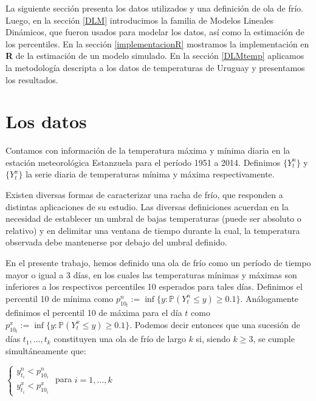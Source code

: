 \documentclass[12pt]{article}\usepackage[]{graphicx}\usepackage[]{color}
\newcommand{\p}{\mathbb{P}}
\begin{document}
La siguiente sección presenta los datos utilizados y una definición de ola de frío. Luego, en la sección \ref{DLM} introducimos la familia de Modelos Lineales Dinámicos, que fueron usados para modelar los datos, así como la estimación de los percentiles. En la sección \ref{implementacionR} mostramos la implementación en \textbf{R} de la estimación de un modelo simulado. En la sección \ref{DLMtemp} aplicamos la metodología descripta a los datos de temperaturas de Uruguay y presentamos los resultados.

\section{Los datos}

Contamos con información de la temperatura máxima y mínima diaria en la estación meteorológica Estanzuela para el período 1951 a 2014. Definimos $\{Y^n_{t}\}$ y $\{Y^x_{t}\}$ la serie diaria de temperaturas mínima y máxima respectivamente.

Existen diversas formas de caracterizar una racha de frío, que responden a distintas aplicaciones de su estudio. Las diversas definiciones acuerdan en la necesidad de establecer un umbral de bajas temperaturas (puede ser absoluto o relativo) y en delimitar una ventana de tiempo durante la cual, la temperatura observada debe mantenerse por debajo del umbral definido. 

En el presente trabajo, hemos definido una ola de frío como un período de tiempo mayor o igual a 3 días, en los cuales las temperaturas mínimas y máximas son inferiores a los respectivos percentiles 10 esperados para tales días. Definimos el percentil 10 de mínima como $p^n_{10_t}:= \inf\{y: \p(Y^n_t \leq y)\geq 0.1\}$. Análogamente definimos el percentil 10 de máxima para el día $t$ como $p^x_{10_t}:= \inf\{y: \p(Y^x_t \leq y)\geq 0.1\}$. Podemos decir entonces que una sucesión de días $t_1, \dots, t_k$ constituyen una ola de frío de largo $k$ si, siendo $k\geq 3$, se cumple simultáneamente que:

$\begin{cases} y^n_{t_i} < p^n_{10_i}  \\ y^x_{t_i} < p^x_{10_i} \end{cases}$ para $i=1,\dots,k$
\end{document}
